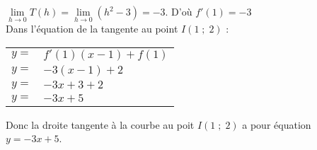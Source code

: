 $\lim\limits_{h \to 0}T(h) = \lim\limits_{h \to 0} (h^2 - 3) = -3$. D'où $f'(1) = -3$ \\

Dans l'équation de la tangente au point $I(1 \; ; \; 2)$ :  \\

\begin{tabular}{ll}
$y = $ & $f'(1)(x-1) + f(1)$ \\
$y = $ & $-3\left(x-1\right) + 2$ \\
$y = $ & $-3x + 3 + 2$ \\
$y = $ & $-3x + 5$ \\
\end{tabular}

\vspace*{.3cm} 

Donc la droite tangente à la courbe au poit $I(1 \; ; \; 2)$ a pour équation $y = -3x + 5$. 